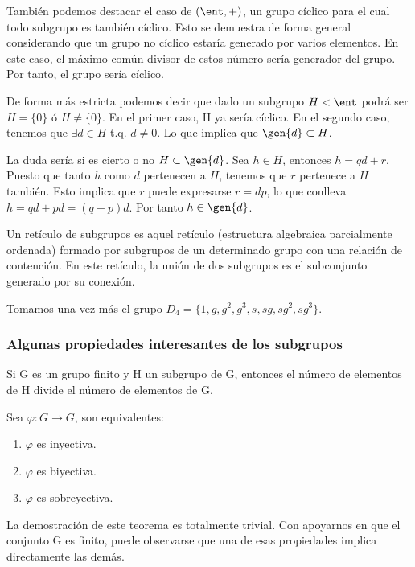 \documentclass[nochap]{apuntes}
\begin{document}
   También podemos destacar el caso de $(\ent, +)$, un grupo cíclico para el cual todo subgrupo es también cíclico. Esto se demuestra
   de forma general considerando que un grupo no cíclico estaría generado por varios elementos. En este caso, el máximo común
   divisor de estos número sería generador del grupo. Por tanto, el grupo sería cíclico.

   De forma más estricta podemos decir que dado un subgrupo $H<\ent$ podrá ser $H=\{0\}$ ó $H\neq\{0\}$.
   En el primer caso, H ya sería cíclico. En el segundo caso, tenemos que $\exists  d \in  H$ t.q. $d\neq 0$. Lo que implica
   que $\gen{d} \subset H$.

   La duda sería si es cierto o no $H\subset \gen{d}$. Sea $h \in H$, entonces $h=qd+r$. Puesto que tanto $h$ como $d$ pertenecen a $H$,
   tenemos que $r$ pertenece a $H$ también. Esto implica que $r$ puede expresarse $r=dp$, lo que conlleva $h=qd+pd=(q+p)d$. Por tanto $h \in \gen{d}$.

  \begin{defn}
   Un retículo de subgrupos es aquel retículo (estructura algebraica parcialmente ordenada) formado por subgrupos de un determinado grupo
   con una relación de contención. En este retículo, la unión de dos subgrupos es el subconjunto generado por su conexión.
  \end{defn}

  \begin{example}
   Tomamos una vez más el grupo $D_{4}=\{1,g,g^{2}, g^{3}, s, sg, sg^{2}, sg^{3}\}$.\\


  \end{example}

\subsubsection{Algunas propiedades interesantes de los subgrupos}
 \begin{theorem}
   Si G es un grupo finito y H un subgrupo de G, entonces el número de elementos de H divide el número de elementos de G.
  \end{theorem}

  \begin{lemma}
   Sea $\varphi: G\rightarrow G$, son equivalentes:
   \begin{enumerate}
    \item $\varphi$  es inyectiva.
    \item $\varphi$  es biyectiva.
    \item $\varphi$  es sobreyectiva.
   \end{enumerate}
  \end{lemma}
  La demostración de este teorema es totalmente trivial. Con apoyarnos en que el conjunto G es finito, puede observarse que una de
  esas propiedades implica directamente las demás.
\end{document}
